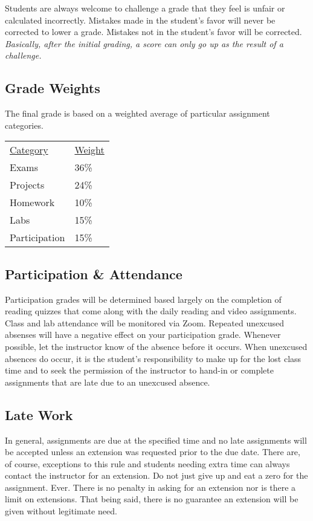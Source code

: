 \documentclass[10pt]{article}
\begin{document}
Students are always welcome to challenge a grade that they feel is unfair or calculated incorrectly.  Mistakes made in the student's favor will never be corrected to lower a grade.  Mistakes not in the student's favor will be corrected.  \textit{Basically, after the initial grading, a score can only go up as the result of a challenge.}



\subsection{Grade Weights}

The final grade is based on a weighted average of particular assignment categories.

\begin{center}
  \begin{tabular}{ll}
  \underline{Category} & \underline{Weight} \\
    Exams & 36\% \\ %
    Projects & 24\% \\ %
    Homework & 10\% \\ %
    Labs & 15\% \\ %
    Participation & 15\%
  \end{tabular}
\end{center}

\subsection{Participation \& Attendance}

Participation grades will be determined based largely on the completion of reading quizzes that come along
with the daily reading and video assignments. Class and lab attendance will be monitored via Zoom. Repeated unexcused absenses will have a negative effect on your participation grade. Whenever possible, let the instructor know of the absence before it occurs. When unexcused absences do occur, it is the student's responsibility to make up for the lost class time and to seek the permission of the instructor to hand-in or complete assignments that are late due to an unexcused absence.

\subsection{Late Work}

In general, assignments are due at the specified time and no late assignments will be accepted unless an extension was requested prior to the due date. There are, of course, exceptions to this rule and students needing extra time can always contact the instructor for an extension. Do not just give up and eat a zero for the assignment. Ever. There is no penalty in asking for an extension nor is there a limit on extensions.  That being said, there is no guarantee an extension will be given without legitimate need.
\end{document}
